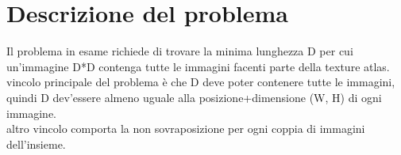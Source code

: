 





	\section{Descrizione del problema}



Il problema in esame richiede di trovare la minima lunghezza D per cui un'immagine D*D contenga tutte le immagini facenti parte della texture atlas. \\
vincolo principale del problema è che D deve poter contenere tutte le immagini, quindi D dev'essere almeno uguale alla posizione+dimensione (W, H) di ogni immagine. \\
altro vincolo comporta la non sovraposizione per ogni coppia di immagini dell'insieme. \\



	\newpage